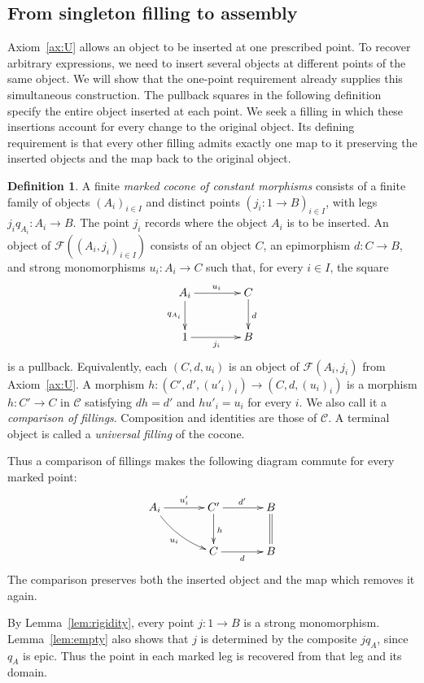 \documentclass[11pt,a4paper]{article}
\theoremstyle{plain}
\theoremstyle{definition}
\newtheorem{definition}[theorem]{Definition}
\theoremstyle{remark}
\newcommand{\C}{\mathcal C}
\newcommand{\one}{1}
\newcommand{\Fill}{\mathcal F}
\begin{document}
\subsection{From singleton filling to assembly}\label{sec:filling}
Axiom~\ref{ax:U} allows an object to be inserted at one prescribed
point. To recover arbitrary expressions, we need to insert several
objects at different points of the same object. We will show that the
one-point requirement already supplies this simultaneous construction.
The pullback squares in the following definition specify the entire
object inserted at each point. We seek a filling in which these
insertions account for every change to the original object. Its
defining requirement is that every other filling admits exactly one
map to it preserving the inserted objects and the map back to the
original object.
\begin{definition}\label{def:finitefilling}
A finite \emph{marked cocone of constant morphisms} consists of a
finite family of objects $(A_i)_{i\in I}$ and distinct points
$(j_i:\one\to B)_{i\in I}$, with legs $j_iq_{A_i}:A_i\to B$.
The point $j_i$ records where the object $A_i$ is to be inserted.
An object of $\Fill((A_i,j_i)_{i\in I})$ consists of an object
$C$, an epimorphism $d:C\to B$, and strong monomorphisms
$u_i:A_i\to C$ such that, for every $i\in I$, the square
\[
 \xymatrix@C=4em@R=2.5em{
A_i\ar[r]^{u_i}\ar[d]_{q_{A_i}}&C\ar[d]^d\\
 \one\ar[r]_{j_i}&B
 }
\]
is a pullback. Equivalently, each $(C,d,u_i)$ is an object of
$\Fill(A_i,j_i)$ from Axiom~\ref{ax:U}.
A morphism
$h:(C',d',(u'_i)_i)\to(C,d,(u_i)_i)$ is a morphism
$h:C'\to C$ in $\C$ satisfying $dh=d'$ and $hu'_i=u_i$ for
every $i$. We also call it a \emph{comparison of fillings}.
Composition and identities are those of $\C$.
A terminal object is called a \emph{universal filling} of the cocone.
\end{definition}

Thus a comparison of fillings makes the following diagram commute
for every marked point:
\[
\xymatrix@C=3.5em@R=2.5em{
A_i\ar[r]^{u'_i}\ar@/_0.5pc/[dr]_{u_i}
  &C'\ar[r]^{d'}\ar[d]^h&B\ar@{=}[d]\\
&C\ar[r]_d&B
}
\]
The comparison preserves both the inserted object and the map
which removes it again.

By Lemma~\ref{lem:rigidity}, every point $j:\one\to B$ is a
strong monomorphism. Lemma~\ref{lem:empty} also shows that $j$ is
determined by the composite $jq_A$, since $q_A$ is epic. Thus the
point in each marked leg is recovered from that leg and its domain.
\end{document}
